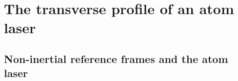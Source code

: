 \chapter{The transverse profile of an atom laser}
\label{TransverseProfile}
\graphicspath{{Figures/TransverseProfile/}{Figures/Common/}}

\section{Non-inertial reference frames and the atom laser}
\label{TransverseProfile:DropGP}